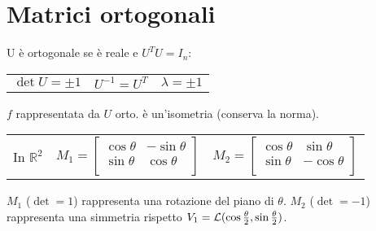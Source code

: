 \section{Matrici ortogonali}

U è ortogonale se è reale e $U^TU=I_n$:

\begin{tabular}{lll}
	$\det U = \pm1$ & $U^{-1}=U^T$ & $\lambda = \pm 1$
\end{tabular}

$f$ rappresentata da $U$ orto. è un'isometria (conserva la norma).

\begin{tabular}{lll}
	In $\mathbb{R}^2$ &
	$
		M_1 = \begin{bmatrix}
			\cos\theta & -\sin\theta \\
			\sin\theta & \cos\theta \\
		\end{bmatrix}
	$ &
	$
		M_2 = \begin{bmatrix}
			\cos\theta & \sin\theta \\
			\sin\theta & -\cos\theta \\
		\end{bmatrix}
	$
\end{tabular}

$M_1$ ($\det = 1$) rappresenta una rotazione del piano di $\theta$. $M_2$ ($\det = -1$) rappresenta una simmetria rispetto $V_1 = \mathcal{L}(\cos\frac{\theta}{2}, \sin\frac{\theta}{2})$.
